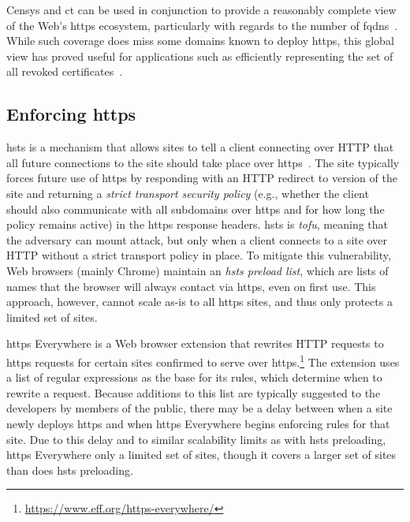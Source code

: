 Censys and \ac{ct} can be used in conjunction to provide a reasonably complete
view of the Web's \ac{https} ecosystem, particularly with regards to the number
of \acsp{fqdn}~\cite{vandersloot2016towards}. While such coverage does miss some
domains known to deploy \ac{https}, this global view has proved useful for
applications such as efficiently representing the set of all revoked
certificates~\cite{larisch2017crlite}.

\subsection{Enforcing \ac{https}}

\ac{hsts} is a mechanism that allows sites to tell a client connecting over HTTP
that all future connections to the site should take place over
\ac{https}~\cite{rfc6797}. The site typically forces future use of \ac{https} by
responding with an HTTP redirect to  version of the site and
returning a \emph{strict transport security policy} (e.g., whether the client
should also communicate with all subdomains over \ac{https} and for how long the
policy remains active) in the \ac{https} response headers. \ac{hsts} is
\emph{\ac{tofu}}, meaning that the adversary can mount  attack, but
only when a client connects to a site over HTTP without a strict transport
policy in place. To mitigate this vulnerability, Web browsers (mainly Chrome)
maintain an \emph{\ac{hsts} preload list}, which are lists of names that the
browser will always contact via \ac{https}, even on first use. This approach,
however, cannot scale as-is to all \ac{https} sites, and thus only protects a
limited set of sites.

\ac{https} Everywhere is a Web browser extension that rewrites HTTP requests to
\ac{https} requests for certain sites confirmed to serve over
\ac{https}.\footnote{\url{https://www.eff.org/https-everywhere/}} The extension
uses a list of regular expressions as the base for its rules, which determine
when to rewrite a request. Because additions to this list are typically
suggested to the developers by members of the public, there may be a delay
between when a site newly deploys \ac{https} and when \ac{https} Everywhere
begins enforcing rules for that site. Due to this delay and to similar
scalability limits as with \ac{hsts} preloading, \ac{https} Everywhere only a
limited set of sites, though it covers a larger set of sites than does \ac{hsts}
preloading. 

